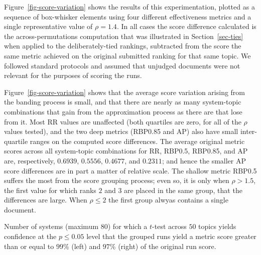 Figure~\ref{fig-score-variation} shows the results of this
experimentation, plotted as a sequence of box-whisker elements using
four different effectiveness metrics and a single representative
value of $\rho=1.4$.
In all cases the score difference calculated is the
across-permutations computation that was illustrated in
Section~\ref{sec-ties} when applied to the deliberately-tied
rankings, subtracted from the score the same metric achieved on the
original submitted ranking for that same topic.
We followed standard protocols and assumed that unjudged documents
were not relevant for the purposes of scoring the runs.

Figure~\ref{fig-score-variation} shows that the average score
variation arising from the banding process is small, and that there
are nearly as many system-topic combinations that gain from the
approximation process as there are that lose from it.
Most RR values are unaffected (both quartiles are zero, for all of
the $\rho$ values tested), and the two deep metrics (RBP0.85 and
AP) also have small inter-quartile ranges on the computed score
differences.
The average original metric scores across all system-topic
combinations for RR, RBP0.5, RBP0.85, and AP are, respectively,
$0.6939$, $0.5556$, $0.4677$, and $0.2311$; and hence the
smaller AP score differences are in part a matter of relative scale.
The shallow metric RBP0.5 suffers the most from the score grouping
process; even so, it is only when $\rho>1.5$, the first value for
which ranks $2$ and $3$ are placed in the same group, that the
differences are large.
When  $\rho\le2$ the first group alwyas contains a
single document.

\begin{table}[t!]
\centering

\caption{Number of systems (maximum $80$) for which a $t$-test across
$50$ topics yields confidence at the $p\le0.05$ level that the
grouped runs yield a metric score greater than or equal to $99$\%
(left) and $97$\% (right) of the original run score.
\label{tbl-frac-significant}}
\end{table}

